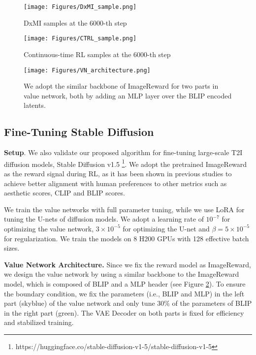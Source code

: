 \documentclass{article}
\theoremstyle{plain}
\theoremstyle{definition}
\theoremstyle{remark}
\begin{document}
\begin{figure}[htbp]
    \centering
    \begin{minipage}[t]{0.23\textwidth}
        \centering
        \texttt{[image: Figures/DxMI\_sample.png]}
        \caption{DxMI samples at the $6000$-th step}
        \label{fig:DxMI_sample}
    \end{minipage}%
    \hspace{2mm}
    \begin{minipage}[t]{0.23\textwidth}
        \centering
        \texttt{[image: Figures/CTRL\_sample.png]}
        \caption{Continuous-time RL samples at the $6000$-th step}
        \label{fig:CTRL_sample}
    \end{minipage}
\end{figure}

\begin{figure}[!h]
    \centering
    \texttt{[image: Figures/VN\_architecture.png]}
    \caption{We adopt the similar backbone of ImageReward for two parts in value network, both by adding an MLP layer over the BLIP encoded latents.}
    \label{fig:arch}
    \vspace{-5 pt}
\end{figure}


\subsection{Fine-Tuning Stable Diffusion}
\label{Sec: experiment SD 1.5}

\textbf{Setup}. We also validate our proposed algorithm for fine-tuning large-scale T2I diffusion models, Stable Diffusion v1.5 \footnote{https://huggingface.co/stable-diffusion-v1-5/stable-diffusion-v1-5}. We adopt the pretrained ImageReward \cite{ImageReward} as the reward signal during RL, as it has been shown in previous studies to achieve better alignment with human preferences to other metrics such as aesthetic scores, CLIP and BLIP scores.

We train the value networks with full parameter tuning, while we use LoRA \cite{hu2021lora} for tuning the U-nets of diffusion models. We adopt a learning rate of $10^{-7}$ for optimizing the value network, $3\times 10^{-5}$ for optimizing the U-net and $\beta=5\times 10^{-5}$ for regularization. We train the models on 8 H200 GPUs with 128 effective batch sizes.

\textbf{Value Network Architecture.} Since we fix the reward model as ImageReward, we design the value network by using a similar backbone to the ImageReward model, which is composed of BLIP and a MLP header (see Figure \ref{fig:arch}).  
To ensure the boundary condition, we fix the parameters (i.e., BLIP and MLP) in the left part (skyblue) of the value network and only tune 30\% of the parameters of BLIP in the right part (green). 
The VAE Decoder on both parts is fixed for efficiency and stabilized training. 
\end{document}
